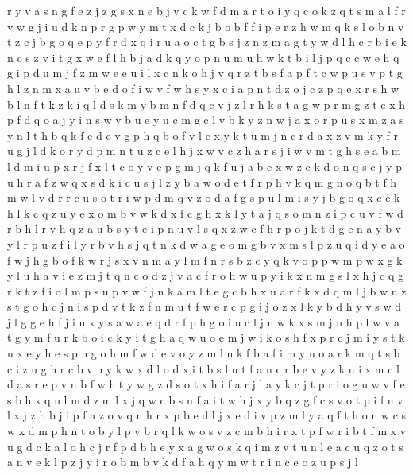 \documentclass{article}
\begin{document}
r y v a s n g f e z j
z g s x n e b j v c k w f d m a r t o i y q
c o k z q
t s m a l f r v w g j i u d k n p
r g p w y m t x d c k j b o
b f
f i p e r z h w m q k s l o b n v t
z c j b g o q e p y f r d x
q i r u a o c t g b s j z n
z m a g t y w d l h c r b i e k n
c s z v i t g x w e f l h b j a d k q y o p n u m
u h w k t b i l j p q c
c w e h q g i p d
u m j
f z m w
e
e u i l x c n k o h j v q r z t b s f a p
f t c w p u s v
p t g h l z n m x a u v b e d o f i w
v f w h s y x c i a p n t d z o j
c z p q e x r s h w b l n f t
k
z k
i q l d s k m
y b m n f d q c v j z l r h k s t a g w p
r m g z t c x h p f d q o a j y i n s w v b u e
y u c
m g c l v b k y z n w j a x o r p u s
x m z a s y n l t h b q k f c d e v g
p h q b o f v l e x y k t u m j n c r d
a x z v m k y f r u g j l d
k o r y d p m n t u z c e l h j x w v
c z h a r s j i w v m t
g h s e a b m l
d m i u p x r j f
x l t c o y v e p g m j q k f
u j a b e x w z c k d o n q s
c j y p u h r a f z w q x s d k
i c u s j l z y b a w o d e t f r p h v k q m g n
o q b t f h m w l v d r
r
c u s o t r i w p d
m q v z o d a f g s p
u l m i s y j b g o q x c e k
h l k c q z u y e x o m b v w
k d x f c g h
x k l y t a j q s o m n z i p c u v f w d r b h
l r v h q z a u b s y t e i p n
u v l s q x z w c f h r p o j k t d g e n a y b
v y l r
p u z f i l y r b v h s j q t n k d w a g e o m
g b v x m s l p z u q i d y e a o f w j
h g b o f k w r j s x v n m a y l
m f n r s b z c y q k v o p
p w m
p w x g k y l u h a v i e z m j t q n c o
d z j v a c f r o h w u p y i k x n m g s
l x h j c
q g r k t z f i o l m p s
u p v w f j n k a m l t e g c b h x
u a r f k x d q m l j b w n z s t g
o h c j n i s p d v t k z f
n m u t f w e r c p g i j o z x l k y b d h
y v s w d j l g
g e h f j i u x y s a w
a e q d r f p h g o i u c l j n w k x s m
j n h p l w v a t g y m f u r k b o i
c k y i t g h a q w u o e m
j w i k o s h f x p r
c j m i y s t k
u x e y h
e s p n g o h m f
w d e v o y z m l n k f b a
f i m y u o a
r k m q t s b c i z u
g h r c b v u y k w x d l o
d x i t b s
l u t f a n c r b e v
y z k u i x m c l d a s r e p v n b f w h t
y w g z d s o t x h i f a r j l
a y k c j t p r i o g u w v f e s b h x q n l m d z
m l x j q w c b s n f a
i t w h j x y b q z g f c s v o
t p i f n v l x j z h b
j i p
f a z o v q n h r x p b e d l
j x e d i v p z
m l y a q f t h o n w c s
w x d m p h n t o b y l
p v b
r
q l k w o s v z c m b h i r x t p f
w r i b t f m x v u g d c k a l o h
c j r f p d b h e y x a g w o s k q i m z v t u n l
e a c u q z o t s
a n v e k l p z j y i r o b m
b v k d f a h q y m w t r i n c e o z u p s j l
\end{document}
